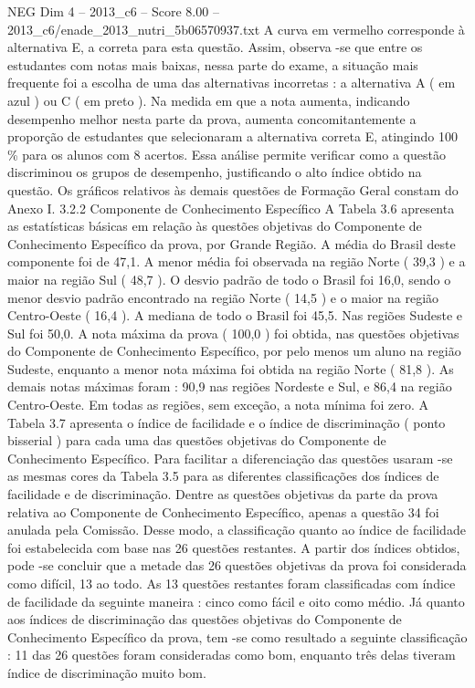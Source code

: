 \begin{textsample}{NEG Dim 4 – 2013\_c6 – Score 8.00 – 2013\_c6/enade\_2013\_nutri\_5b06570937.txt}
A curva em vermelho corresponde à alternativa E, a correta para esta questão.
Assim, observa -se que entre os estudantes com notas mais baixas, nessa parte do exame, a situação mais frequente foi a escolha de uma das alternativas incorretas : a alternativa A ( em azul ) ou C ( em preto ).
Na medida em que a nota aumenta, indicando desempenho melhor nesta parte da prova, aumenta concomitantemente a proporção de estudantes que selecionaram a alternativa correta E, atingindo 100 \% para os alunos com 8 acertos.
Essa análise permite verificar como a questão discriminou os grupos de desempenho, justificando o alto índice obtido na questão.
Os gráficos relativos às demais questões de Formação Geral constam do Anexo I. 3.2.2 Componente de Conhecimento Específico A Tabela 3.6 apresenta as estatísticas básicas em relação às questões objetivas do Componente de Conhecimento Específico da prova, por Grande Região.
A média do Brasil deste componente foi de 47,1.
A menor média foi observada na região Norte ( 39,3 ) e a maior na região Sul ( 48,7 ).
O desvio padrão de todo o Brasil foi 16,0, sendo o menor desvio padrão encontrado na região Norte ( 14,5 ) e o maior na região Centro-Oeste ( 16,4 ).
A mediana de todo o Brasil foi 45,5.
Nas regiões Sudeste e Sul foi 50,0.
A nota máxima da prova ( 100,0 ) foi obtida, nas questões objetivas do Componente de Conhecimento Específico, por pelo menos um aluno na região Sudeste, enquanto a menor nota máxima foi obtida na região Norte ( 81,8 ).
As demais notas máximas foram : 90,9 nas regiões Nordeste e Sul, e 86,4 na região Centro-Oeste.
Em todas as regiões, sem exceção, a nota mínima foi zero.
A Tabela 3.7 apresenta o índice de facilidade e o índice de discriminação ( ponto bisserial ) para cada uma das questões objetivas do Componente de Conhecimento Específico.
Para facilitar a diferenciação das questões usaram -se as mesmas cores da Tabela 3.5 para as diferentes classificações dos índices de facilidade e de discriminação.
Dentre as questões objetivas da parte da prova relativa ao Componente de Conhecimento Específico, apenas a questão 34 foi anulada pela Comissão.
Desse modo, a classificação quanto ao índice de facilidade foi estabelecida com base nas 26 questões restantes.
A partir dos índices obtidos, pode -se concluir que a metade das 26 questões objetivas da prova foi considerada como difícil, 13 ao todo.
As 13 questões restantes foram classificadas com índice de facilidade da seguinte maneira : cinco como fácil e oito como médio.
Já quanto aos índices de discriminação das questões objetivas do Componente de Conhecimento Específico da prova, tem -se como resultado a seguinte classificação : 11 das 26 questões foram consideradas como bom, enquanto três delas tiveram índice de discriminação muito bom.

\end{textsample}
